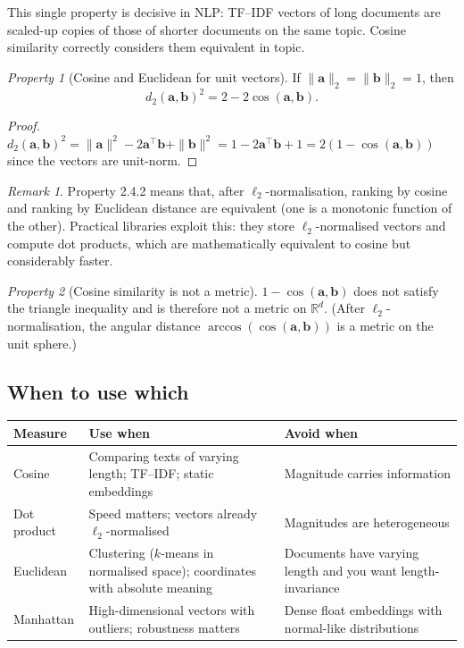 \documentclass[12pt,a4paper]{report}
\theoremstyle{definition}
\theoremstyle{remark}
\newtheorem{remark}{Remark}[section]
\newtheorem{property}{Property}[section]
\begin{document}
This single property is decisive in NLP: TF--IDF vectors of long documents are scaled-up copies of those of shorter documents on the same topic. Cosine similarity correctly considers them equivalent in topic.

\begin{property}[Cosine and Euclidean for unit vectors]
If $\|\mathbf{a}\|_2 = \|\mathbf{b}\|_2 = 1$, then
\[ d_2(\mathbf{a}, \mathbf{b})^2 = 2 - 2 \cos(\mathbf{a}, \mathbf{b}). \]
\end{property}

\begin{proof}
$d_2(\mathbf{a}, \mathbf{b})^2 = \|\mathbf{a}\|^2 - 2 \mathbf{a}^\top \mathbf{b} + \|\mathbf{b}\|^2 = 1 - 2 \mathbf{a}^\top \mathbf{b} + 1 = 2(1 - \cos(\mathbf{a}, \mathbf{b}))$ since the vectors are unit-norm.
\end{proof}

\begin{remark}
Property 2.4.2 means that, after $\ell_2$-normalisation, ranking by cosine and ranking by Euclidean distance are equivalent (one is a monotonic function of the other). Practical libraries exploit this: they store $\ell_2$-normalised vectors and compute dot products, which are mathematically equivalent to cosine but considerably faster.
\end{remark}

\begin{property}[Cosine similarity is not a metric]
$1 - \cos(\mathbf{a}, \mathbf{b})$ does not satisfy the triangle inequality and is therefore not a metric on $\mathbb{R}^d$. (After $\ell_2$-normalisation, the angular distance $\arccos(\cos(\mathbf{a}, \mathbf{b}))$ is a metric on the unit sphere.)
\end{property}

\subsection{When to use which}

\begin{center}
\begin{tabular}{|l|l|l|}
\hline
\textbf{Measure} & \textbf{Use when} & \textbf{Avoid when} \\
\hline
Cosine & Comparing texts of varying length; TF--IDF; static embeddings & Magnitude carries information \\
Dot product & Speed matters; vectors already $\ell_2$-normalised & Magnitudes are heterogeneous \\
Euclidean & Clustering ($k$-means in normalised space); coordinates with absolute meaning & Documents have varying length and you want length-invariance \\
Manhattan & High-dimensional vectors with outliers; robustness matters & Dense float embeddings with normal-like distributions \\
\hline
\end{tabular}
\end{center}
\end{document}
